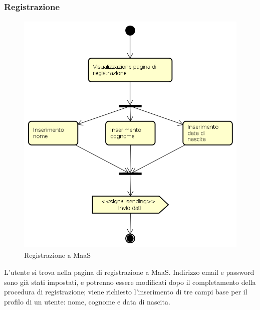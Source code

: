 \subsubsection{Registrazione}
\begin{figure}[H]
\begin{center}
\includegraphics[height=12cm]{res/sections/backend/activities/registrazione.png}
\caption{Registrazione a MaaS}
\end{center}
\end{figure}
L'utente si trova nella pagina di registrazione a MaaS. Indirizzo email e password sono già stati impostati, e potrenno essere modificati dopo il completamento della procedura di registrazione; viene richiesto l'inserimento di tre campi base per il profilo di un utente: nome, cognome e data di nascita.
